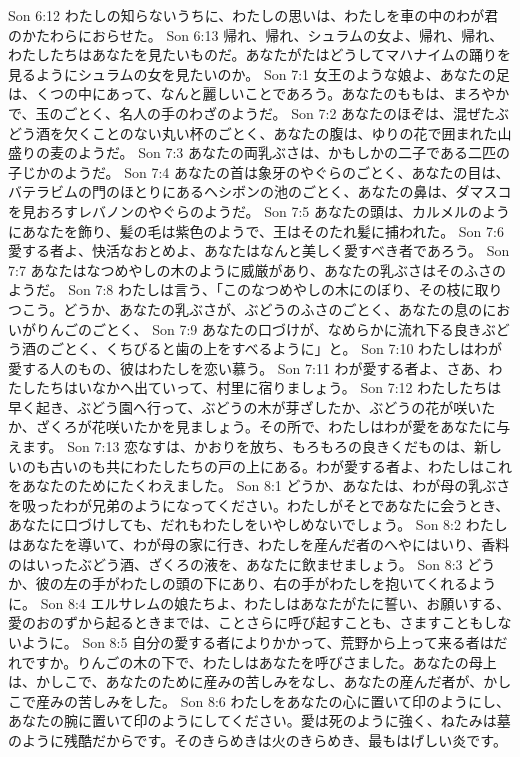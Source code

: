Son 6:12  わたしの知らないうちに、わたしの思いは、わたしを車の中のわが君のかたわらにおらせた。
Son 6:13  帰れ、帰れ、シュラムの女よ、帰れ、帰れ、わたしたちはあなたを見たいものだ。あなたがたはどうしてマハナイムの踊りを見るようにシュラムの女を見たいのか。
Son 7:1  女王のような娘よ、あなたの足は、くつの中にあって、なんと麗しいことであろう。あなたのももは、まろやかで、玉のごとく、名人の手のわざのようだ。
Son 7:2  あなたのほぞは、混ぜたぶどう酒を欠くことのない丸い杯のごとく、あなたの腹は、ゆりの花で囲まれた山盛りの麦のようだ。
Son 7:3  あなたの両乳ぶさは、かもしかの二子である二匹の子じかのようだ。
Son 7:4  あなたの首は象牙のやぐらのごとく、あなたの目は、バテラビムの門のほとりにあるヘシボンの池のごとく、あなたの鼻は、ダマスコを見おろすレバノンのやぐらのようだ。
Son 7:5  あなたの頭は、カルメルのようにあなたを飾り、髪の毛は紫色のようで、王はそのたれ髪に捕われた。
Son 7:6  愛する者よ、快活なおとめよ、あなたはなんと美しく愛すべき者であろう。
Son 7:7  あなたはなつめやしの木のように威厳があり、あなたの乳ぶさはそのふさのようだ。
Son 7:8  わたしは言う、「このなつめやしの木にのぼり、その枝に取りつこう。どうか、あなたの乳ぶさが、ぶどうのふさのごとく、あなたの息のにおいがりんごのごとく、
Son 7:9  あなたの口づけが、なめらかに流れ下る良きぶどう酒のごとく、くちびると歯の上をすべるように」と。
Son 7:10  わたしはわが愛する人のもの、彼はわたしを恋い慕う。
Son 7:11  わが愛する者よ、さあ、わたしたちはいなかへ出ていって、村里に宿りましょう。
Son 7:12  わたしたちは早く起き、ぶどう園へ行って、ぶどうの木が芽ざしたか、ぶどうの花が咲いたか、ざくろが花咲いたかを見ましょう。その所で、わたしはわが愛をあなたに与えます。
Son 7:13  恋なすは、かおりを放ち、もろもろの良きくだものは、新しいのも古いのも共にわたしたちの戸の上にある。わが愛する者よ、わたしはこれをあなたのためにたくわえました。
Son 8:1  どうか、あなたは、わが母の乳ぶさを吸ったわが兄弟のようになってください。わたしがそとであなたに会うとき、あなたに口づけしても、だれもわたしをいやしめないでしょう。
Son 8:2  わたしはあなたを導いて、わが母の家に行き、わたしを産んだ者のへやにはいり、香料のはいったぶどう酒、ざくろの液を、あなたに飲ませましょう。
Son 8:3  どうか、彼の左の手がわたしの頭の下にあり、右の手がわたしを抱いてくれるように。
Son 8:4  エルサレムの娘たちよ、わたしはあなたがたに誓い、お願いする、愛のおのずから起るときまでは、ことさらに呼び起すことも、さますこともしないように。
Son 8:5  自分の愛する者によりかかって、荒野から上って来る者はだれですか。りんごの木の下で、わたしはあなたを呼びさました。あなたの母上は、かしこで、あなたのために産みの苦しみをなし、あなたの産んだ者が、かしこで産みの苦しみをした。
Son 8:6  わたしをあなたの心に置いて印のようにし、あなたの腕に置いて印のようにしてください。愛は死のように強く、ねたみは墓のように残酷だからです。そのきらめきは火のきらめき、最もはげしい炎です。
